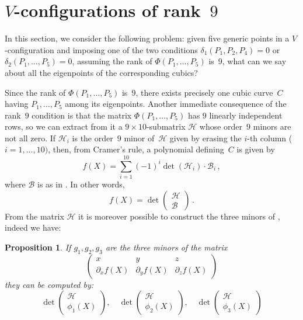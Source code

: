 \documentclass[a4paper, 11pt, reqno]{amsart}
\theoremstyle{plain}
\newtheorem{prop}[lemma]{Proposition}
\theoremstyle{definition}
\newcommand{\de}{\partial}
\begin{document}
\section{\texorpdfstring{$V$}{V}-configurations of rank~\texorpdfstring{$9$}{9}}
\label{rank_9}

In this section, we consider the following problem:
given five generic points in a $V$-configuration and imposing one
of the two conditions
$\delta_1(P_1, P_2, P_4) = 0$ or $\delta_2(P_1, \dots, P_5) = 0$, assuming the rank of $\Phi(P_1, \dots, P_5)$ is~$9$, what can we say about all the eigenpoints of the corresponding cubics?

Since the rank of $\Phi(P_1, \dots, P_5)$ is~$9$, there exists precisely one cubic curve~$C$ having $P_1, \dots, P_5$ among its eigenpoints. Another immediate consequence of the rank~$9$ condition is that the
matrix $\Phi(P_1, \dots, P_5)$ has $9$ linearly independent rows, so
we can extract from it a $9 \times 10$-submatrix
$\mathcal{H}$ whose order~$9$ minors are not all zero. 
If $\mathcal{H}_i$ is the order~$9$ minor of~$\mathcal{H}$ given by erasing the $i$-th column ($i=1, \dots, 10)$, 
then, from Cramer's rule, a polynomial defining~$C$ is given by
%
\[
  f(X) = \sum_{i=1}^{10}(-1)^i\det(\mathcal{H}_i)\cdot \mathcal{B}_i \,,
\]
%
where $\mathcal{B}$ is as in . In other words,
%
\[
  f(X) = \det \left( 
  \begin{array}{c} \mathcal{H} \\ \mathcal{B} \end{array}
  \right) \,.
\]
%
From the matrix $\mathcal{H}$ it is moreover possible to construct
the three minors of , indeed we have:
\begin{prop}
\label{proposition:geiser1}
If $g_1, g_2, g_3$ are the three minors of the matrix
%
\[
  \left(
  \begin{array}{ccc}
    x & y & z \\
    \de_x f(X) & \de_y f(X) & \de_z f(X)
  \end{array}
  \right)
\]
%
they can be computed by:
%
\[
  \det \left( 
  \begin{array}{c} \mathcal{H} \\ \phi_1(X) \end{array}
  \right),\quad
  \det \left( 
  \begin{array}{c} \mathcal{H} \\ \phi_2(X) \end{array}
  \right), \quad
  \det \left( 
  \begin{array}{c} \mathcal{H} \\ \phi_3(X) \end{array}
  \right)
\]
%
\end{prop}
\end{document}

